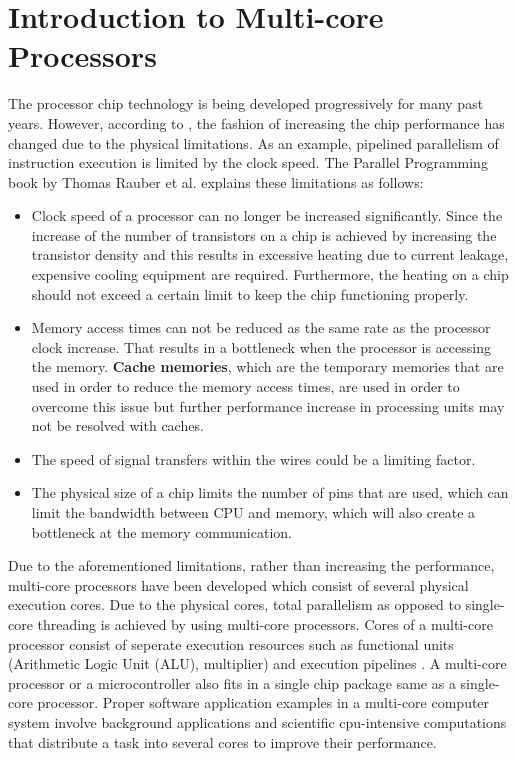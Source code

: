 \section{Introduction to Multi-core Processors} %
The processor chip technology is being developed progressively for many past years. However, according to \cite{springerparallel}, the fashion of increasing the chip performance has changed due to the physical limitations. As an example, pipelined parallelism of instruction execution is limited by the clock speed. The Parallel Programming book by Thomas Rauber et al. \cite{springerparallel} explains these limitations as follows:
\begin{itemize}
	\item Clock speed of a processor can no longer be increased significantly. Since the increase of the number of transistors on a chip is achieved by increasing the transistor density and this results in excessive heating due to current leakage, expensive cooling equipment are required. Furthermore, the heating on a chip should not exceed a certain limit to keep the chip functioning properly.
	\item Memory access times can not be reduced as the same rate as the processor clock increase. That results in a bottleneck when the processor is accessing the memory. \textbf{Cache memories}, which are the temporary memories that are used in order to reduce the memory access times, are used in order to overcome this issue but further performance increase in processing units may not be resolved with caches.
	\item The speed of signal transfers within the wires could be a limiting factor.
	\item The physical size of a chip limits the number of pins that are used, which can limit the bandwidth between CPU and memory, which will also create a bottleneck at the memory communication.
\end{itemize}
Due to the aforementioned limitations, rather than increasing the performance, multi-core processors have been developed which consist of several physical execution cores. Due to the physical cores, total parallelism as opposed to single-core threading is achieved by using multi-core processors. Cores of a multi-core processor consist of seperate execution resources such as functional units (Arithmetic Logic Unit (ALU), multiplier) and execution pipelines \cite{springerparallel}. A multi-core processor or a microcontroller also fits in a single chip package same as a single-core processor. Proper software application examples in a multi-core computer system involve background applications and scientific cpu-intensive computations that distribute a task into several cores to improve their performance.

